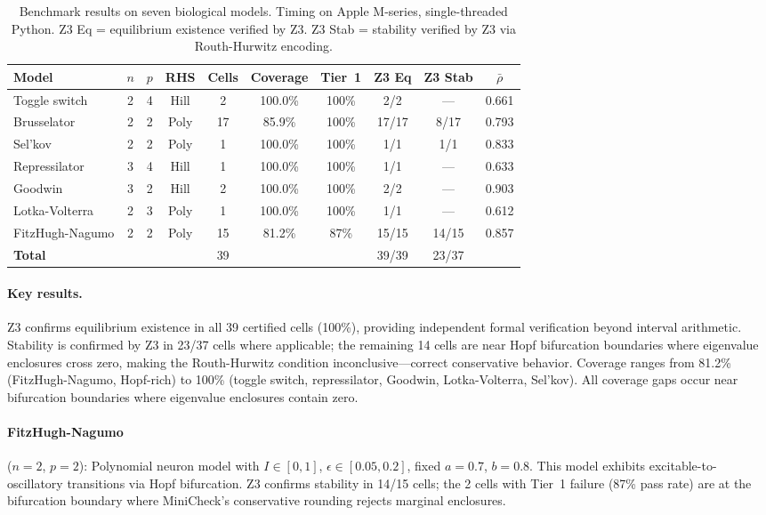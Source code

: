 \documentclass[11pt]{article}
\begin{document}
\begin{table}[t]
\centering
\caption{Benchmark results on seven biological models. Timing on Apple M-series, single-threaded Python. Z3 Eq = equilibrium existence verified by Z3. Z3 Stab = stability verified by Z3 via Routh-Hurwitz encoding.}
\label{tab:benchmarks}
\small
\begin{tabular}{@{}lccccccccc@{}}
\toprule
Model & $n$ & $p$ & RHS & Cells & Coverage & Tier~1 & Z3 Eq & Z3 Stab & $\bar{\rho}$ \\
\midrule
Toggle switch    & 2 & 4 & Hill & 2  & 100.0\% & 100\% & 2/2  & ---  & 0.661 \\
Brusselator      & 2 & 2 & Poly & 17 & 85.9\%  & 100\% & 17/17 & 8/17 & 0.793 \\
Sel'kov          & 2 & 2 & Poly & 1  & 100.0\% & 100\% & 1/1  & 1/1  & 0.833 \\
Repressilator    & 3 & 4 & Hill & 1  & 100.0\% & 100\% & 1/1  & ---  & 0.633 \\
Goodwin          & 3 & 2 & Hill & 2  & 100.0\% & 100\% & 2/2  & ---  & 0.903 \\
Lotka-Volterra   & 2 & 3 & Poly & 1  & 100.0\% & 100\% & 1/1  & ---  & 0.612 \\
FitzHugh-Nagumo  & 2 & 2 & Poly & 15 & 81.2\%  & 87\%  & 15/15 & 14/15 & 0.857 \\
\midrule
\textbf{Total}   &   &   &      & 39 &         &       & 39/39 & 23/37 & \\
\bottomrule
\end{tabular}
\end{table}

\paragraph{Key results.}
Z3 confirms equilibrium existence in all 39 certified cells (100\%), providing independent formal verification beyond interval arithmetic.
Stability is confirmed by Z3 in 23/37 cells where applicable; the remaining 14 cells are near Hopf bifurcation boundaries where eigenvalue enclosures cross zero, making the Routh-Hurwitz condition inconclusive---correct conservative behavior.
Coverage ranges from 81.2\% (FitzHugh-Nagumo, Hopf-rich) to 100\% (toggle switch, repressilator, Goodwin, Lotka-Volterra, Sel'kov).
All coverage gaps occur near bifurcation boundaries where eigenvalue enclosures contain zero.

\paragraph{FitzHugh-Nagumo} ($n{=}2$, $p{=}2$): Polynomial neuron model with $I \in [0, 1]$, $\epsilon \in [0.05, 0.2]$, fixed $a{=}0.7$, $b{=}0.8$.
This model exhibits excitable-to-oscillatory transitions via Hopf bifurcation.
Z3 confirms stability in 14/15 cells; the 2 cells with Tier~1 failure (87\% pass rate) are at the bifurcation boundary where MiniCheck's conservative rounding rejects marginal enclosures.
\end{document}
